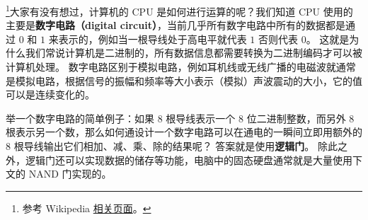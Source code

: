 
\begin{issues}
\issueDraft
\end{issues}

\footnote{参考 Wikipedia \href{https://en.wikipedia.org/wiki/Boolean_algebra}{相关页面}。}大家有没有想过，计算机的 CPU 是如何进行运算的呢？我们知道 CPU 使用的主要是\textbf{数字电路（digital circuit）}，当前几乎所有数字电路中所有的数据都是通过 $0$ 和 $1$ 来表示的，例如当一根导线处于高电平就代表 $1$ 否则代表 $0$。 这就是为什么我们常说计算机是二进制的，所有数据信息都需要转换为二进制编码才可以被计算机处理。 数字电路区别于模拟电路，例如耳机线或无线广播的电磁波就通常是模拟电路，根据信号的振幅和频率等大小表示（模拟）声波震动的大小，它的值可以是连续变化的。

举一个数字电路的简单例子：如果 8 根导线表示一个 8 位二进制整数，而另外 8 根表示另一个数，那么如何通设计一个数字电路可以在通电的一瞬间立即用额外的 8 根导线输出它们相加、减、乘、除的结果呢？ 答案就是使用\textbf{逻辑门}。 除此之外，逻辑门还可以实现数据的储存等功能，电脑中的固态硬盘通常就是大量使用下文的 NAND 门实现的。

